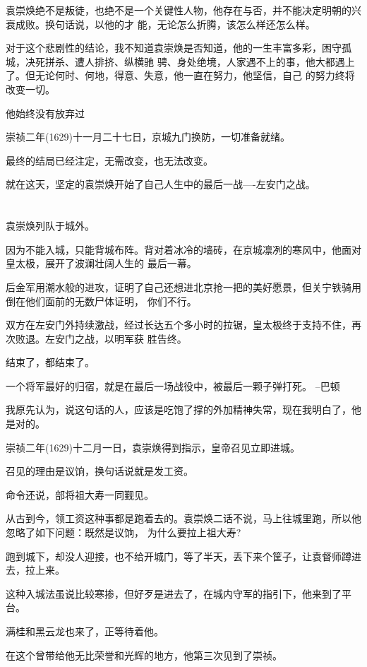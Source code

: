 \documentclass[11pt,a4paper,onecolumn]{article}
\begin{document}
袁崇焕绝不是叛徒，也绝不是一个关键性人物，他存在与否，并不能决定明朝的兴衰成败。换句话说，以他的才
能，无论怎么折腾，该怎么样还怎么样。

对于这个悲剧性的结论，我不知道袁崇焕是否知道，他的一生丰富多彩，困守孤城，决死拼杀、遭人排挤、纵横驰
骋、身处绝境，人家遇不上的事，他大都遇上了。但无论何时、何地，得意、失意，他一直在努力，他坚信，自己
的努力终将改变一切。

他始终没有放弃过

崇祯二年(1629)十一月二十七日，京城九门换防，一切准备就绪。

最终的结局已经注定，无需改变，也无法改变。

就在这天，坚定的袁崇焕开始了自己人生中的最后一战----左安门之战。

\section[\thesection]{}

袁崇焕列队于城外。

因为不能入城，只能背城布阵。背对着冰冷的墙砖，在京城凛冽的寒风中，他面对皇太极，展开了波澜壮阔人生的
最后一幕。

后金军用潮水般的进攻，证明了自己还想进北京抢一把的美好愿景，但关宁铁骑用倒在他们面前的无数尸体证明，
你们不行。

双方在左安门外持续激战，经过长达五个多小时的拉锯，皇太极终于支持不住，再次败退。左安门之战，以明军获
胜告终。

结束了，都结束了。

一个将军最好的归宿，就是在最后一场战役中，被最后一颗子弹打死。 --巴顿

我原先认为，说这句话的人，应该是吃饱了撑的外加精神失常，现在我明白了，他是对的。

崇祯二年(1629)十二月一日，袁崇焕得到指示，皇帝召见立即进城。

召见的理由是议饷，换句话说就是发工资。

命令还说，部将祖大寿一同觐见。

从古到今，领工资这种事都是跑着去的。袁崇焕二话不说，马上往城里跑，所以他忽略了如下问题：既然是议饷，
为什么要拉上祖大寿?

跑到城下，却没人迎接，也不给开城门，等了半天，丢下来个筐子，让袁督师蹲进去，拉上来。

这种入城法虽说比较寒掺，但好歹是进去了，在城内守军的指引下，他来到了平台。

满桂和黑云龙也来了，正等待着他。

在这个曾带给他无比荣誉和光辉的地方，他第三次见到了崇祯。
\end{document}
